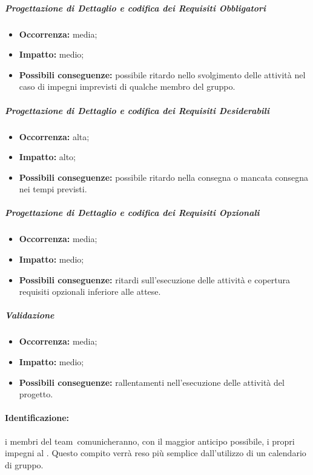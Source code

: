 \documentclass[../PianoProgetto.tex]{subfiles}
\begin{document}
		\subparagraph*{Progettazione di Dettaglio e codifica dei Requisiti Obbligatori}
			\begin{itemize}[label={-}]
				\item \textbf{Occorrenza:} media;
				\item \textbf{Impatto:} medio;
				\item \textbf{Possibili conseguenze:} possibile ritardo nello svolgimento delle attività nel caso di impegni imprevisti di qualche membro del gruppo.
			\end{itemize}
			
		\subparagraph*{Progettazione di Dettaglio e codifica dei Requisiti Desiderabili}
			\begin{itemize}[label={-}]
				\item \textbf{Occorrenza:} alta;
				\item \textbf{Impatto:} alto;
				\item \textbf{Possibili conseguenze:} possibile ritardo nella consegna o mancata consegna nei tempi previsti.
			\end{itemize}
			
		\subparagraph*{Progettazione di Dettaglio e codifica dei Requisiti Opzionali}
			\begin{itemize}[label={-}]
				\item \textbf{Occorrenza:} media;
				\item \textbf{Impatto:} medio;
				\item \textbf{Possibili conseguenze:} ritardi sull'esecuzione delle attività e copertura requisiti opzionali inferiore alle attese.
			\end{itemize}
			
		\subparagraph*{Validazione}
			\begin{itemize}[label={-}]
				\item \textbf{Occorrenza:} media;
				\item \textbf{Impatto:} medio;
				\item \textbf{Possibili conseguenze:} rallentamenti nell'esecuzione delle attività del progetto.
			\end{itemize}
		
	\paragraph*{Identificazione:} i membri del team\g\ comunicheranno, con il maggior anticipo possibile, i propri impegni al \responsabilediprogetto . Questo compito verrà reso più semplice dall'utilizzo di un calendario di gruppo. 
	
\end{document}
